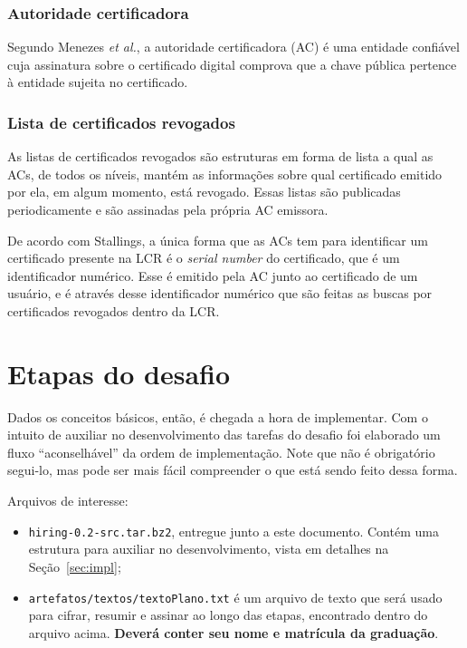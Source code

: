 \documentclass{article}
\begin{document}
\subsubsection{Autoridade certificadora}\label{subsubsec:ac}

Segundo Menezes \textit{et al.}, a autoridade certificadora (AC) é uma entidade
confiável cuja assinatura sobre o certificado digital comprova que a chave
pública pertence à entidade sujeita no certificado.

\subsubsection{Lista de certificados revogados}\label{subsubsec:crl}

As listas de certificados revogados são estruturas em forma de lista a qual as
ACs, de todos os níveis, mantém as informações sobre qual certificado emitido
por ela, em algum momento, está revogado. Essas listas são publicadas
periodicamente e são assinadas pela própria AC emissora.

De acordo com Stallings, a única forma que as ACs tem para identificar um
certificado presente na LCR é o \textit{serial number} do certificado, que é um
identificador numérico. Esse é emitido pela AC junto ao certificado de um
usuário, e é através desse identificador numérico que são feitas as buscas por
certificados revogados dentro da LCR\@.

\section{Etapas do desafio}\label{sec:steps}

Dados os conceitos básicos, então, é chegada a hora de implementar. Com o
intuito de auxiliar no desenvolvimento das tarefas do desafio foi elaborado um
fluxo ``aconselhável'' da ordem de implementação. Note que não é obrigatório
segui-lo, mas pode ser mais fácil compreender o que está sendo feito dessa
forma.

Arquivos de interesse:

\begin{itemize}
  \item \texttt{hiring-0.2-src.tar.bz2}, entregue junto a este documento.
      Contém uma estrutura para auxiliar no desenvolvimento, vista em detalhes
        na Seção~\ref{sec:impl};
  \item \texttt{artefatos/textos/textoPlano.txt} é um arquivo de texto que será
      usado para cifrar, resumir e assinar ao longo das etapas, encontrado
        dentro do arquivo acima. \textbf{Deverá conter seu nome e matrícula da
        graduação}.
\end{itemize}
\end{document}
